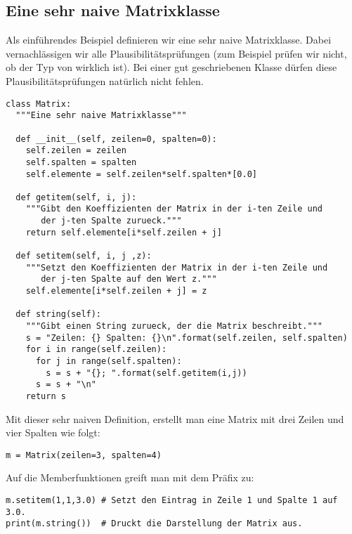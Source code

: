 \subsection{Eine sehr naive Matrixklasse}
\label{section:klassen:eine_sehr_naive_matrixklasse}
Als einführendes Beispiel definieren wir eine sehr naive Matrixklasse.
Dabei ver\-nach\-läs\-sig\-en wir alle Plausibilitätsprüfungen
(zum Beispiel prüfen wir nicht, ob der Typ von  wirklich  ist).
Bei einer gut geschriebenen Klasse dürfen diese Plausibilitätsprüfungen natürlich nicht fehlen.
\begin{lstlisting}
class Matrix:
  """Eine sehr naive Matrixklasse"""
  
  def __init__(self, zeilen=0, spalten=0):
    self.zeilen = zeilen
    self.spalten = spalten
    self.elemente = self.zeilen*self.spalten*[0.0]
  
  def getitem(self, i, j):
    """Gibt den Koeffizienten der Matrix in der i-ten Zeile und
       der j-ten Spalte zurueck."""
    return self.elemente[i*self.zeilen + j]
  
  def setitem(self, i, j ,z):
    """Setzt den Koeffizienten der Matrix in der i-ten Zeile und
       der j-ten Spalte auf den Wert z."""
    self.elemente[i*self.zeilen + j] = z
  
  def string(self):
    """Gibt einen String zurueck, der die Matrix beschreibt."""
    s = "Zeilen: {} Spalten: {}\n".format(self.zeilen, self.spalten)
    for i in range(self.zeilen):
      for j in range(self.spalten):
        s = s + "{}; ".format(self.getitem(i,j))
      s = s + "\n"
    return s
\end{lstlisting}
Mit dieser sehr naiven Definition, erstellt man eine Matrix mit drei Zeilen und vier Spalten wie folgt:
\begin{lstlisting}
m = Matrix(zeilen=3, spalten=4)
\end{lstlisting}
Auf die Memberfunktionen greift man mit dem Präfix  zu:
\begin{lstlisting}
m.setitem(1,1,3.0) # Setzt den Eintrag in Zeile 1 und Spalte 1 auf 3.0.
print(m.string())  # Druckt die Darstellung der Matrix aus.
\end{lstlisting}
